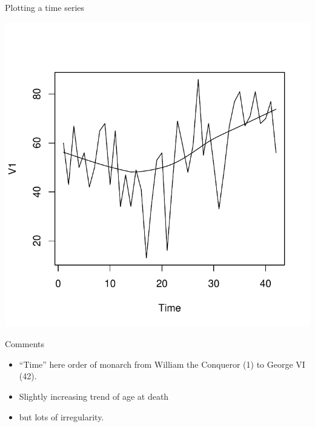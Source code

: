 \begin{frame}[fragile]{Plotting a time series}
  
\begin{knitrout}
\color{fgcolor}\begin{kframe}
\begin{alltt}
 \hlstd{(}
\end{alltt}
\end{kframe}
\includegraphics[width=\maxwidth]{figure/raghib-1} 

\end{knitrout}
  
\end{frame}

\begin{frame}[fragile]{Comments}
  
  \begin{itemize}
  \item ``Time'' here order of monarch from William the Conqueror (1)
    to George VI (42).
  \item Slightly increasing trend of age at death
  \item but lots of irregularity.
  \end{itemize}
  
\end{frame}

